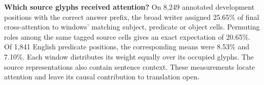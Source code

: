 \noindent\textbf{Which source glyphs received attention?} On 8,249 annotated development positions with the correct answer prefix, the broad writer assigned 25.65\% of final cross-attention to windows' matching subject, predicate or object cells. Permuting roles among the same tagged source cells gives an exact expectation of 20.65\%. Of 1,841 English predicate positions, the corresponding means were 8.53\% and 7.10\%. Each window distributes its weight equally over its occupied glyphs. The source representations also contain sentence context. These measurements locate attention and leave its causal contribution to translation open.\par\medskip


